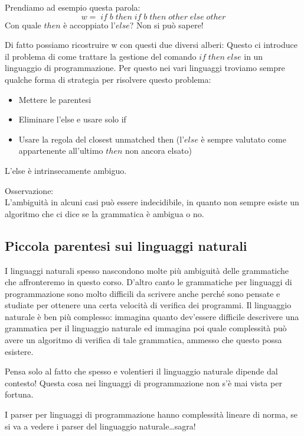 \documentclass[class=book, crop=false, oneside, 12pt]{standalone}
\begin{document}
Prendiamo ad esempio questa parola:
\begin{equation}
    w =\; if\; b\; then\; if\; b\; then\; other\; else\; other
\end{equation}
Con quale $then$ è accoppiato l’$else$? Non si può sapere!

Di fatto possiamo ricostruire w con questi due diversi alberi:
Questo ci introduce il problema di come trattare la gestione del comando $if \; then \; else$ in un linguaggio di programmazione. 
Per questo nei vari linguaggi troviamo sempre qualche forma di strategia per risolvere questo problema:
\begin{itemize}
    \item Mettere le parentesi
    \item Eliminare l’else e usare solo if
    \item Usare la regola del closest unmatched then (l’$else$ è sempre valutato come appartenente all’ultimo $then$ non ancora elsato)
\end{itemize}	
L’else è intrinsecamente ambiguo.

Osservazione:\\
L’ambiguità in alcuni casi può essere indecidibile, in quanto non sempre esiste un algoritmo che ci dice se la grammatica è ambigua o no.

\subsection{Piccola parentesi sui linguaggi naturali}
I linguaggi naturali spesso nascondono molte più ambiguità delle grammatiche che affronteremo in questo corso.
D'altro canto le grammatiche per linguaggi di programmazione sono molto difficili da scrivere anche perché sono pensate e studiate per ottenere una certa velocità di verifica dei programmi.
Il linguaggio naturale è ben più complesso: immagina quanto dev’essere difficile descrivere una grammatica per il linguaggio naturale ed immagina poi quale complessità può avere un algoritmo di verifica di tale grammatica, ammesso che questo possa esistere.

Pensa solo al fatto che spesso e volentieri il linguaggio naturale dipende dal contesto! Questa cosa nei linguaggi di programmazione non s’è mai vista per fortuna.

I parser per linguaggi di programmazione hanno complessità lineare di norma, se si va a vedere i parser del linguaggio naturale\dots sagra!
\end{document}

